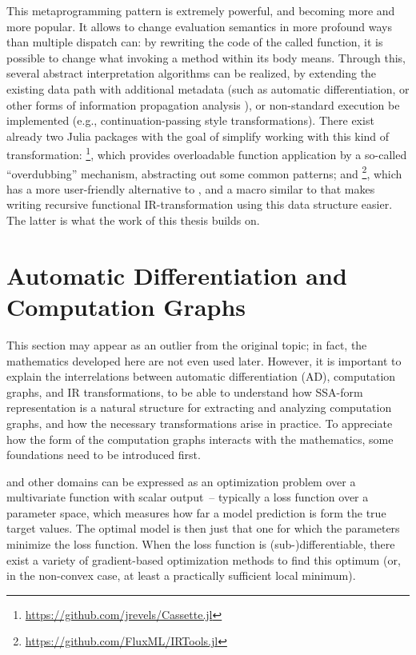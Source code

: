 This metaprogramming pattern is extremely powerful, and becoming more and more popular.  It allows
to change evaluation semantics in more profound ways than multiple dispatch can: by rewriting the
code of the called function, it is possible to change what invoking a method within its body means.
Through this, several abstract interpretation algorithms can be realized, by extending the existing
data path with additional metadata (such as automatic differentiation, or other forms of information
propagation analysis \parencite[part II]{singer2018static}), or non-standard execution be
implemented (e.g., continuation-passing style transformations).  There exist already two Julia
packages with the goal of simplify working with this kind of transformation:
\footnote{\protect\url{https://github.com/jrevels/Cassette.jl}}, which
provides overloadable function application by a so-called \enquote{overdubbing} mechanism,
abstracting out some common patterns; and
\footnote{\protect\url{https://github.com/FluxML/IRTools.jl}}, which has a
more user-friendly alternative to , and a macro similar to  that
makes writing recursive functional IR-transformation using this data structure easier.  The latter is
what the work of this thesis builds on.


\section[Automatic Differentiation and Computation Graphs]{Automatic Differentiation and \newline
  Computation Graphs}
\label{sec:cg-ad}

This section may appear as an outlier from the original topic; in fact, the mathematics developed
here are not even used later.  However, it is important to explain the interrelations between
automatic differentiation (AD), computation graphs, and IR transformations, to be able to understand
how SSA-form representation is a natural structure for extracting and analyzing computation graphs,
and how the necessary transformations arise in practice.  To appreciate how the form of the
computation graphs interacts with the mathematics, some foundations need to be introduced first.

 and other domains can be expressed as an
optimization problem over a multivariate function with scalar output~-- typically a loss function
over a parameter space, which measures how far a model prediction is form the true target values.
The optimal model is then just that one for which the parameters minimize the loss function.  When
the loss function is (sub-)differentiable, there exist a variety of gradient-based optimization
methods to find this optimum (or, in the non-convex case, at least a practically sufficient local
minimum).

